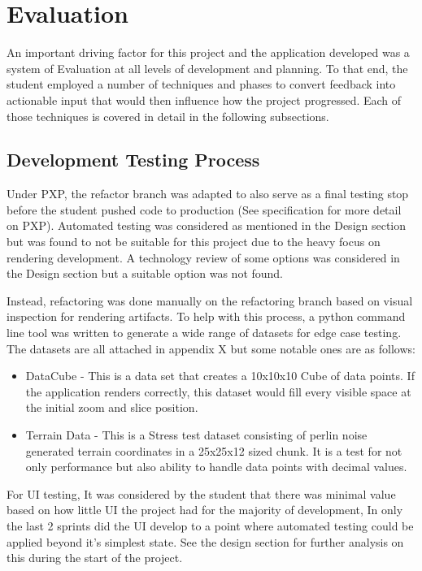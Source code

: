 \section{Evaluation}
An important driving factor for this project and the application developed was a system of Evaluation at all levels of development and planning. To that end, the student employed a
number of techniques and phases to convert feedback into actionable input that would then influence how the project progressed. Each of those techniques is covered in detail in the following subsections.

\subsection{Development Testing Process}
Under PXP, the refactor branch was adapted to also serve as a final testing stop before the student pushed code to production (See specification for more detail on PXP). Automated testing was considered as mentioned in the Design section but was found to not be suitable for this project due to the heavy focus on rendering development.
A technology review of some options was considered in the Design section but a suitable option was not found.

Instead, refactoring was done manually on the refactoring branch based on visual inspection for rendering artifacts. To help with this process, a python command line tool was written to generate a wide range of datasets for edge case testing. The datasets are all attached in appendix X but some notable ones are as follows:

\begin{itemize}
    \item DataCube - This is a data set that creates a 10x10x10 Cube of data points. If the application renders correctly, this dataset would fill every visible space at the initial zoom and slice position.
    \item Terrain Data - This is a Stress test dataset consisting of perlin noise generated terrain coordinates in a 25x25x12 sized chunk. It is a test for not only performance but also ability to handle data points with decimal values.
\end{itemize}

For UI testing, It was considered by the student that there was minimal value based on how little UI the project had for the majority of development, In only the last 2 sprints did the UI develop to a point where automated testing could be applied beyond it's simplest state. See the design section for further analysis on this during the start of the project.

